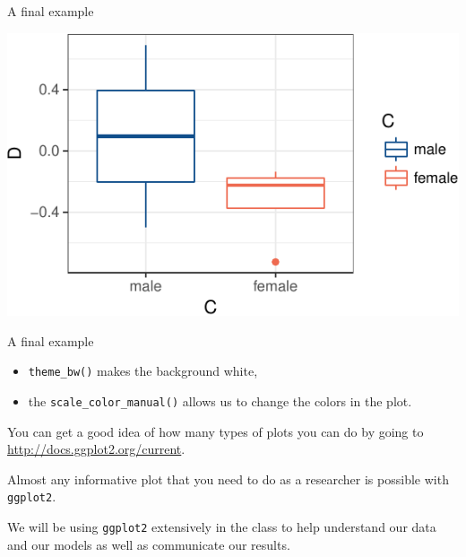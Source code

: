 \begin{frame}[fragile]{A final example}

\begin{Shaded}
\begin{Highlighting}[]
\NormalTok{(}\OperatorTok{+}
\StringTok{  }\NormalTok{(}\NormalTok{(}\OperatorTok{+}
\StringTok{  }\NormalTok{() }\OperatorTok{+}
\StringTok{  }\NormalTok{(} \NormalTok{(}\NormalTok{, }\NormalTok{))}
\end{Highlighting}
\end{Shaded}

\includegraphics{03_UnderstandData_files/figure-beamer/unnamed-chunk-14-1.pdf}

\end{frame}

\begin{frame}[fragile]{A final example}

\begin{itemize}
\tightlist
\item
  \texttt{theme\_bw()} makes the background white,
\item
  the \texttt{scale\_color\_manual()} allows us to change the colors in
  the plot.
\end{itemize}

You can get a good idea of how many types of plots you can do by going
to
\href{http://docs.ggplot2.org/current/}{http://docs.ggplot2.org/current}.

Almost any informative plot that you need to do as a researcher is
possible with \texttt{ggplot2}.

We will be using \texttt{ggplot2} extensively in the class to help
understand our data and our models as well as communicate our results.

\end{frame}

